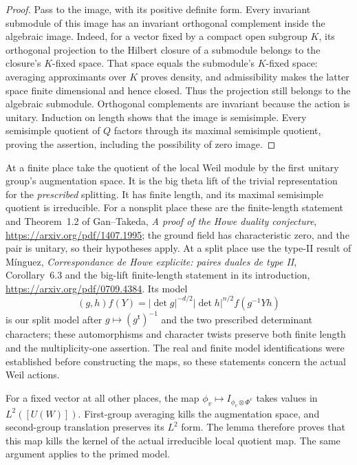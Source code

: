 \begin{proof}
Pass to the image, with its positive definite form. Every invariant
submodule of this image has an invariant orthogonal complement
inside the algebraic image. Indeed, for a vector fixed by a compact
open subgroup \(K\), its orthogonal projection to the Hilbert closure
of a submodule belongs to the closure's \(K\)-fixed space.
That space equals the submodule's \(K\)-fixed space: averaging
approximants over \(K\) proves density, and admissibility makes the
latter space finite dimensional and hence closed. Thus the
projection still belongs to the algebraic submodule. Orthogonal
complements are invariant because the action is unitary.
Induction on length shows that the image is semisimple.
Every semisimple quotient of \(Q\) factors through its maximal
semisimple quotient, proving the assertion, including the
possibility of zero image.
\end{proof}

At a finite place take the quotient of the local Weil module
by the first unitary group's augmentation space. It is the big
theta lift of the trivial representation for the \emph{prescribed}
splitting. It has finite length, and its maximal semisimple quotient
is irreducible. For a nonsplit place these are the finite-length
statement and Theorem~1.2 of Gan--Takeda,
\emph{A proof of the Howe duality conjecture},
\url{https://arxiv.org/pdf/1407.1995}; the ground field has
characteristic zero, and the pair is unitary, so their hypotheses
apply. At a split place use the type-II result of
M\'inguez, \emph{Correspondance de Howe explicite: paires duales
de type II}, Corollary~6.3 and the big-lift finite-length statement
in its introduction,
\url{https://arxiv.org/pdf/0709.4384}.
Its model
\[
  (g,h)f(Y)=|\det g|^{-d/2}|\det h|^{n/2}f(g^{-1}Yh)
\]
is our split model after \(g\mapsto(g^{\mathsf t})^{-1}\)
and the two prescribed determinant characters; these automorphisms
and character twists preserve both finite length and the
multiplicity-one assertion. The real and finite model
identifications were established before constructing the maps,
so these statements concern the actual Weil actions.

For a fixed vector at all other places, the map
\(\phi_v\mapsto I_{\phi_v\otimes\Phi^v}\) takes values in
\(L^2([U(W)])\). First-group averaging kills the augmentation
space, and second-group translation preserves its \(L^2\) form.
The lemma therefore proves that this map kills the kernel of
the actual irreducible local quotient map. The same argument
applies to the primed model.

